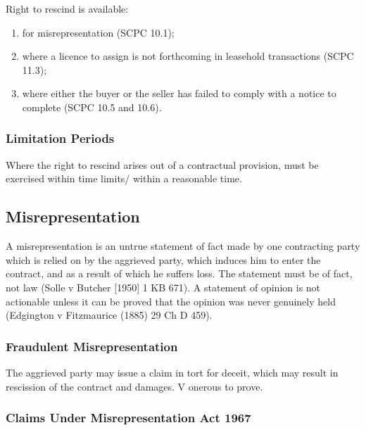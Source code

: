 \documentclass[
]{article}
\providecommand{\tightlist}{%
  \setlength{\itemsep}{0pt}\setlength{\parskip}{0pt}}
\begin{document}
Right to rescind is available:

\begin{enumerate}
\tightlist
\item
  for misrepresentation (SCPC 10.1);
\item
  where a licence to assign is not forthcoming in leasehold transactions
  (SCPC 11.3);
\item
  where either the buyer or the seller has failed to comply with a
  notice to complete (SCPC 10.5 and 10.6).
\end{enumerate}

\hypertarget{limitation-periods-1}{%
\subsubsection{Limitation Periods}\label{limitation-periods-1}}

Where the right to rescind arises out of a contractual provision, must
be exercised within time limits/ within a reasonable time.

\hypertarget{misrepresentation}{%
\subsection{Misrepresentation}\label{misrepresentation}}

A misrepresentation is an untrue statement of fact made by one
contracting party which is relied on by the aggrieved party, which
induces him to enter the contract, and as a result of which he suffers
loss. The statement must be of fact, not law (Solle v Butcher {[}1950{]}
1 KB 671). A statement of opinion is not actionable unless it can be
proved that the opinion was never genuinely held (Edgington v
Fitzmaurice (1885) 29 Ch D 459).

\hypertarget{fraudulent-misrepresentation}{%
\subsubsection{Fraudulent
Misrepresentation}\label{fraudulent-misrepresentation}}

The aggrieved party may issue a claim in tort for deceit, which may
result in rescission of the contract and damages. V onerous to prove.

\hypertarget{claims-under-misrepresentation-act-1967}{%
\subsubsection{Claims Under Misrepresentation Act
1967}\label{claims-under-misrepresentation-act-1967}}
\end{document}
